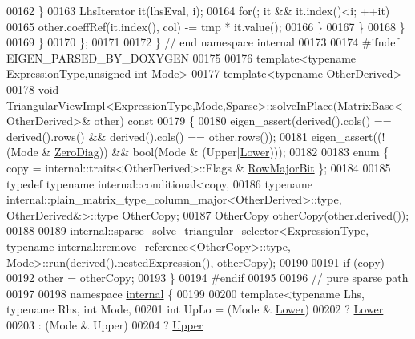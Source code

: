 \begin{DoxyCode}
00162           \}
00163           LhsIterator it(lhsEval, i);
00164           \textcolor{keywordflow}{for}(; it && it.index()<i; ++it)
00165             other.coeffRef(it.index(), col) -= tmp * it.value();
00166         \}
00167       \}
00168     \}
00169   \}
00170 \};
00171 
00172 \} \textcolor{comment}{// end namespace internal}
00173 
00174 \textcolor{preprocessor}{#ifndef EIGEN\_PARSED\_BY\_DOXYGEN}
00175 
00176 \textcolor{keyword}{template}<\textcolor{keyword}{typename} ExpressionType,\textcolor{keywordtype}{unsigned} \textcolor{keywordtype}{int} Mode>
00177 \textcolor{keyword}{template}<\textcolor{keyword}{typename} OtherDerived>
00178 \textcolor{keywordtype}{void} TriangularViewImpl<ExpressionType,Mode,Sparse>::solveInPlace(MatrixBase<OtherDerived>& other)\textcolor{keyword}{ const}
00179 \textcolor{keyword}{}\{
00180   eigen\_assert(derived().cols() == derived().rows() && derived().cols() == other.rows());
00181   eigen\_assert((!(Mode & \hyperlink{group__enums_gga39e3366ff5554d731e7dc8bb642f83cda884ff7240392e85aa6e4b3c957e36483}{ZeroDiag})) && \textcolor{keywordtype}{bool}(Mode & (Upper|\hyperlink{group__enums_gga39e3366ff5554d731e7dc8bb642f83cda891792b8ed394f7607ab16dd716f60e6}{Lower})));
00182 
00183   \textcolor{keyword}{enum} \{ copy = internal::traits<OtherDerived>::Flags & \hyperlink{group__flags_gae4f56c2a60bbe4bd2e44c5b19cbe8762}{RowMajorBit} \};
00184 
00185   \textcolor{keyword}{typedef} \textcolor{keyword}{typename} internal::conditional<copy,
00186     \textcolor{keyword}{typename} internal::plain\_matrix\_type\_column\_major<OtherDerived>::type, OtherDerived&>::type OtherCopy;
00187   OtherCopy otherCopy(other.derived());
00188 
00189   internal::sparse\_solve\_triangular\_selector<ExpressionType, typename
       internal::remove\_reference<OtherCopy>::type, Mode>::run(derived().nestedExpression(), otherCopy);
00190 
00191   \textcolor{keywordflow}{if} (copy)
00192     other = otherCopy;
00193 \}
00194 \textcolor{preprocessor}{#endif}
00195 
00196 \textcolor{comment}{// pure sparse path}
00197 
00198 \textcolor{keyword}{namespace }\hyperlink{namespaceinternal}{internal} \{
00199 
00200 \textcolor{keyword}{template}<\textcolor{keyword}{typename} Lhs, \textcolor{keyword}{typename} Rhs, \textcolor{keywordtype}{int} Mode,
00201   \textcolor{keywordtype}{int} UpLo = (Mode & \hyperlink{group__enums_gga39e3366ff5554d731e7dc8bb642f83cda891792b8ed394f7607ab16dd716f60e6}{Lower})
00202            ? \hyperlink{group__enums_gga39e3366ff5554d731e7dc8bb642f83cda891792b8ed394f7607ab16dd716f60e6}{Lower}
00203            : (Mode & Upper)
00204            ? \hyperlink{group__enums_gga39e3366ff5554d731e7dc8bb642f83cda6bcb58be3b8b8ec84859ce0c5ac0aaec}{Upper}

\end{DoxyCode}
